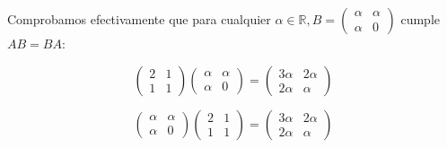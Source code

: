 \begin{itemize}[$\bullet$]
    Comprobamos efectivamente que para cualquier $\alpha \in \mathbb{R}, B = \begin{pmatrix}
                                                                                 \alpha & \alpha \\
                                                                                 \alpha & 0
    \end{pmatrix} $ cumple $AB = BA$:

    \begin{equation*}
        \begin{pmatrix}
            2 & 1 \\
            1 & 1
        \end{pmatrix}
        \begin{pmatrix}
            \alpha & \alpha \\
            \alpha & 0
        \end{pmatrix}
        =
        \begin{pmatrix}
            3\alpha & 2\alpha \\
            2\alpha & \alpha
        \end{pmatrix}
    \end{equation*}

    \begin{equation*}
        \begin{pmatrix}
            \alpha & \alpha \\
            \alpha & 0
        \end{pmatrix}
        \begin{pmatrix}
            2 & 1 \\
            1 & 1
        \end{pmatrix}
        =
        \begin{pmatrix}
            3\alpha & 2\alpha \\
            2\alpha & \alpha
        \end{pmatrix}
    \end{equation*}

\end{itemize}

